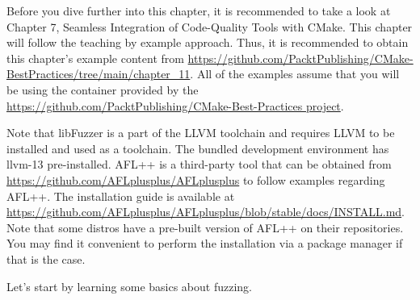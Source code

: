 Before you dive further into this chapter, it is recommended to take a look at Chapter
7, Seamless Integration of Code-Quality Tools with CMake. This chapter will follow the teaching by example approach. Thus, it is recommended to obtain this chapter's example content from \url{https://github.com/PacktPublishing/CMake-BestPractices/tree/main/chapter\_11}. All of the examples assume that you will be using the container provided by the \url{https://github.com/PacktPublishing/CMake-Best-Practices project}.

Note that libFuzzer is a part of the LLVM toolchain and requires LLVM to be installed and used as a toolchain. The bundled development environment has llvm-13 pre-installed. AFL++ is a third-party tool that can be obtained from \url{https://github.com/AFLplusplus/AFLplusplus} to follow examples regarding AFL++. The installation guide is available at \url{https://github.com/AFLplusplus/AFLplusplus/blob/stable/docs/INSTALL.md}. Note that some distros have a pre-built version of AFL++ on their repositories. You may find it convenient to perform the installation via a package manager if that is the case. 

Let's start by learning some basics about fuzzing.